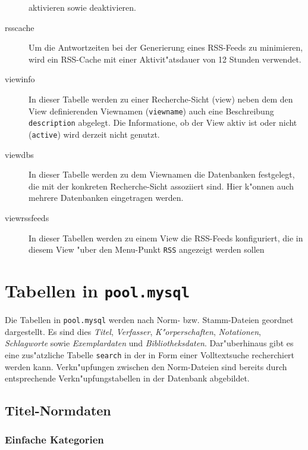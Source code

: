 \documentclass[11pt, twoside, a4paper, BCOR8mm, DIV12, bibtotoc,idxtotoc]{scrbook}
\begin{document}
\begin{description}
  aktivieren sowie deaktivieren.
\item[rsscache] Um die Antwortzeiten bei der Generierung eines
  RSS-Feeds zu minimieren, wird ein RSS-Cache mit einer
  Aktivit"atsdauer von 12 Stunden verwendet.
\item[viewinfo] In dieser Tabelle werden zu einer Recherche-Sicht
  (view) neben dem den View de\-fi\-nier\-enden Viewnamen
  (\texttt{viewname}) auch eine Beschreibung \texttt{description}
  abgelegt. Die Informatione, ob der View aktiv ist oder nicht
  (\texttt{active}) wird derzeit nicht genutzt.
\item[viewdbs] In dieser Tabelle werden zu dem Viewnamen die Datenbanken
  festgelegt, die mit der konkreten Recherche-Sicht assoziiert
  sind. Hier k"onnen auch mehrere Datenbanken ein\-ge\-tra\-gen werden.
\item[viewrssfeeds] In dieser Tabellen werden zu einem View die
  RSS-Feeds konfiguriert, die in diesem View "uber den Menu-Punkt
  \texttt{RSS} angezeigt werden sollen

\end{description}



\chapter{Tabellen in \texttt{pool.mysql}}

Die Tabellen in \texttt{pool.mysql} werden nach Norm- bzw.
Stamm-Dateien geordnet dargestellt. Es sind dies \emph{Titel},
\emph{Verfasser}, \emph{K"orperschaften}, \emph{Notationen},
\emph{Schlagworte} sowie \emph{Exemplardaten} und
\emph{Bibliotheksdaten}. Dar"uberhinaus gibt es eine zus"atzliche
Tabelle \texttt{search} in der in Form einer Volltextsuche
recherchiert werden kann. Verkn"upfungen zwischen den Norm-Dateien
sind bereits durch entsprechende Verkn"upfungstabellen in der
Datenbank abgebildet.


\section{Titel-Normdaten}

\subsection{Einfache Kategorien}
\end{document}
